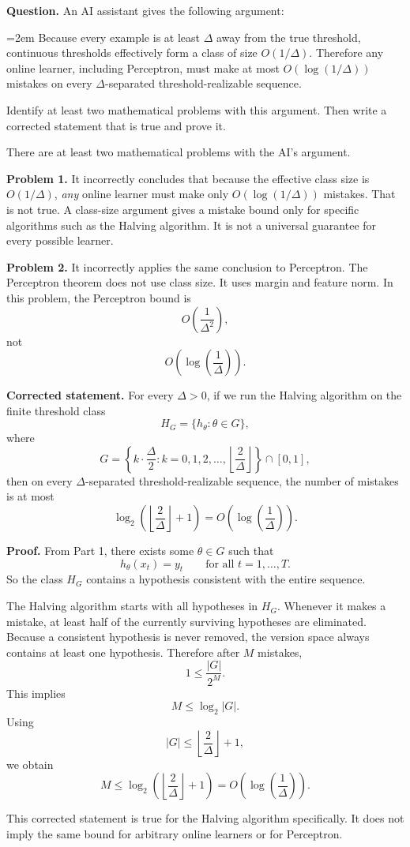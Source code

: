 \documentclass{article}
\begin{document}
\textbf{Question.}
An AI assistant gives the following argument:

\hangindent=2em
Because every example is at least $\Delta$ away from the true threshold, continuous thresholds effectively form a class of size $O(1/\Delta)$. Therefore any online learner, including Perceptron, must make at most $O(\log(1/\Delta))$ mistakes on every $\Delta$-separated threshold-realizable sequence.

Identify at least two mathematical problems with this argument. Then write a
corrected statement that is true and prove it.

\begin{solutionbox}

There are at least two mathematical problems with the AI's argument.

\textbf{Problem 1.}
It incorrectly concludes that because the effective class size is
$O(1/\Delta)$, \emph{any} online learner must make only
$O(\log(1/\Delta))$ mistakes. That is not true. A class-size argument gives a
mistake bound only for specific algorithms such as the Halving algorithm. It is
not a universal guarantee for every possible learner.

\textbf{Problem 2.}
It incorrectly applies the same conclusion to Perceptron. The Perceptron
theorem does not use class size. It uses margin and feature norm. In this
problem, the Perceptron bound is
\[
O\!\left(\frac{1}{\Delta^2}\right),
\]
not
\[
O\!\left(\log\left(\frac{1}{\Delta}\right)\right).
\]

\textbf{Corrected statement.}
For every $\Delta>0$, if we run the Halving algorithm on the finite threshold
class
\[
H_G=\{h_\theta:\theta\in G\},
\]
where
\[
G=
\left\{
k\cdot \frac{\Delta}{2}
:
k=0,1,2,\dots,\left\lfloor \frac{2}{\Delta}\right\rfloor
\right\}
\cap [0,1],
\]
then on every $\Delta$-separated threshold-realizable sequence, the number of
mistakes is at most
\[
\log_2\!\left(\left\lfloor \frac{2}{\Delta}\right\rfloor+1\right)
=
O\!\left(\log\left(\frac{1}{\Delta}\right)\right).
\]

\textbf{Proof.}
From Part 1, there exists some $\theta\in G$ such that
\[
h_\theta(x_t)=y_t
\qquad \text{for all } t=1,\dots,T.
\]
So the class $H_G$ contains a hypothesis consistent with the entire sequence.

The Halving algorithm starts with all hypotheses in $H_G$. Whenever it makes a
mistake, at least half of the currently surviving hypotheses are eliminated.
Because a consistent hypothesis is never removed, the version space always
contains at least one hypothesis. Therefore after $M$ mistakes,
\[
1 \le \frac{|G|}{2^M}.
\]
This implies
\[
M \le \log_2 |G|.
\]
Using
\[
|G| \le \left\lfloor \frac{2}{\Delta}\right\rfloor+1,
\]
we obtain
\[
M
\le
\log_2\!\left(\left\lfloor \frac{2}{\Delta}\right\rfloor+1\right)
=
O\!\left(\log\left(\frac{1}{\Delta}\right)\right).
\]

This corrected statement is true for the Halving algorithm specifically. It
does not imply the same bound for arbitrary online learners or for Perceptron.

\end{solutionbox}
\end{document}
